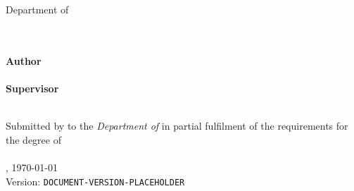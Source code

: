 \begin{titlepage}
    \begin{center}
        {\Large%
           \textsc{\university{}}%
        }
        \\\medskip
        {%
            \textbf{%
                \universityFaculty{}
            }\\
            Department of \universityDepartment{}%
        }
        \\\vfill
        {\Large%
            \textbf{\shortTitle{}}%
        }
		\\\bigskip
        {\Huge%
            \sffamily{%
                \textbf\documentTitle{}%
            }\par%
        }
        \medskip
        {\large%
            \textsl{%
                \documentSubtitle{}%
            }
			\\\vfill
			\textbf{Author}\\
			\documentAuthor{}\\
			\bigskip
			\textbf{Supervisor}\\
			\researchAdvisor{}\\
        }
    \end{center}
	\newpage
	\pagestyle{empty}\vspace*{\fill}%
	\noindent%
	Submitted by \textbf{\documentAuthor{}} to the \textsl{Department of \universityDepartment{}} in partial fulfilment of the requirements for the degree of\\
	\textbf{\academicDegree{}}\\
	\medskip{}
	\documentPlace{}, \germanDate{}\today{}\\
	Version: \texttt{DOCUMENT-VERSION-PLACEHOLDER}\\
\end{titlepage}
